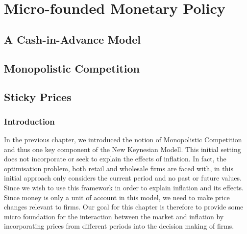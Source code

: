 \documentclass[11pt,a4paper,oneside]{book}
\begin{document}


\part{Micro-founded Monetary Policy}
\chapter{A Cash-in-Advance Model}


\chapter{Monopolistic Competition}


\chapter{Sticky Prices}
\section{Introduction}
In the previous chapter, we introduced the notion of Monopolistic Competition and thus one key component of the New Keynesian Modell. This initial setting does not incorporate or seek to explain the effects of inflation. In fact, the optimisation problem, both retail and wholesale firms are faced with, in this initial approach only considers the current period and no past or future values. Since we wish to use this framework in order to explain inflation and its effects. Since money is only a unit of account in this model, we need to make price changes relevant to firms. Our goal for this chapter is therefore to provide some micro foundation for the interaction between the market and inflation by incorporating prices from different periods into the decision making of firms.
\end{document}
